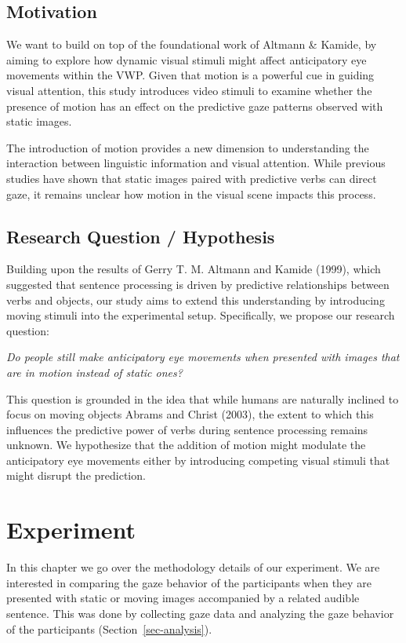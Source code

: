 \documentclass[
  12pt,
  letterpaper,
  DIV=11,
  numbers=noendperiod]{scrreprt}
\begin{document}
\section{Motivation}\label{motivation}

We want to build on top of the foundational work of Altmann \& Kamide,
by aiming to explore how dynamic visual stimuli might affect
anticipatory eye movements within the VWP. Given that motion is a
powerful cue in guiding visual attention, this study introduces video
stimuli to examine whether the presence of motion has an effect on the
predictive gaze patterns observed with static images.

The introduction of motion provides a new dimension to understanding the
interaction between linguistic information and visual attention. While
previous studies have shown that static images paired with predictive
verbs can direct gaze, it remains unclear how motion in the visual scene
impacts this process.

\section{Research Question /
Hypothesis}\label{research-question-hypothesis}

Building upon the results of Gerry T. M. Altmann and Kamide (1999),
which suggested that sentence processing is driven by predictive
relationships between verbs and objects, our study aims to extend this
understanding by introducing moving stimuli into the experimental setup.
Specifically, we propose our research question:

\emph{Do people still make anticipatory eye movements when presented
with images that are in motion instead of static ones?}

This question is grounded in the idea that while humans are naturally
inclined to focus on moving objects Abrams and Christ (2003), the extent
to which this influences the predictive power of verbs during sentence
processing remains unknown. We hypothesize that the addition of motion
might modulate the anticipatory eye movements either by introducing
competing visual stimuli that might disrupt the prediction.

\chapter{Experiment}\label{sec-experiment}

In this chapter we go over the methodology details of our experiment. We
are interested in comparing the gaze behavior of the participants when
they are presented with static or moving images accompanied by a related
audible sentence. This was done by collecting gaze data and analyzing
the gaze behavior of the participants (Section~\ref{sec-analysis}).
\end{document}
